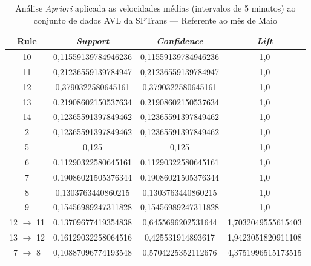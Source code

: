 \documentclass[
	12pt,				%
	oneside,			%
	a4paper,			%
	english,			%
	brazil				%
	]{abntex2ppgsi}
\begin{document}
\begin{apendicesenv}
\begin{table}[!htb]
\centering
\caption {Análise \textit{Apriori} aplicada as velocidades médias (intervalos de 5 minutos) ao conjunto de dados AVL da SPTrans --- Referente ao mês de Maio}
\label {tab:aprioriMay}
\begin{tabular}{c|c|c|c}
\hline
\textbf{Rule} & \textit{\textbf{Support}} & \textit{\textbf{Confidence}} & \textit{\textbf{Lift}} \\
\hline
10 &  0,11559139784946236 &  0,11559139784946236 &  1,0\\
\hline
11 &  0,21236559139784947 &  0,21236559139784947 &  1,0\\
\hline
12 &  0,3790322580645161 &  0,3790322580645161 &  1,0\\
\hline
13 &  0,21908602150537634 &  0,21908602150537634 &  1,0\\
\hline
14 &  0,12365591397849462 &  0,12365591397849462 &  1,0\\
\hline
2 &  0,12365591397849462 &  0,12365591397849462 &  1,0\\
\hline
5 &  0,125 &  0,125 &  1,0\\
\hline
6 &  0,11290322580645161 &  0,11290322580645161 &  1,0\\
\hline
7 &  0,19086021505376344 &  0,19086021505376344 &  1,0\\
\hline
8 &  0,1303763440860215 &  0,1303763440860215 &  1,0\\
\hline
9 &  0,15456989247311828 &  0,15456989247311828 &  1,0\\
\hline
12 $\rightarrow$ 11 &  0,13709677419354838 &  0,6455696202531644 &  1,7032049555615403\\
\hline
13 $\rightarrow$ 12 &  0,16129032258064516 &  0,425531914893617 &  1,9423051820911108\\
\hline
7 $\rightarrow$ 8 &  0,10887096774193548 &  0,5704225352112676 &  4,3751996515173515\\
\hline
\end{tabular}
\end{table}


\end{apendicesenv}
\end{document}

